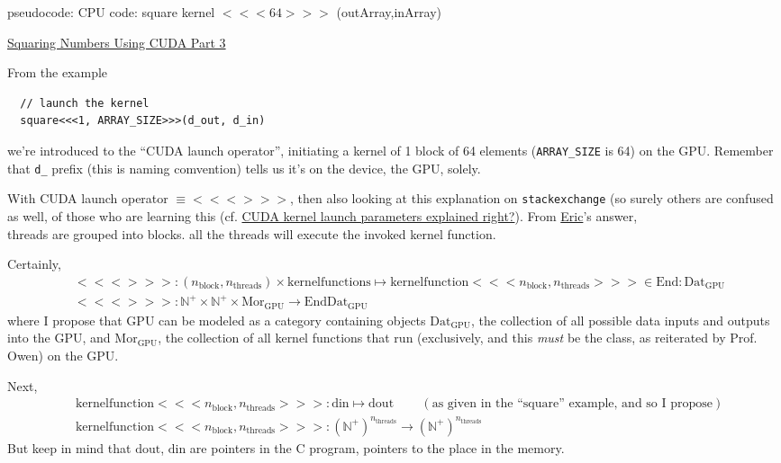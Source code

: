 \documentclass[10pt]{amsart}
\begin{document}
\begin{multicols*}{2}
pseudocode: CPU code: square kernel $<<< 64 >>>$ (outArray,inArray)

\href{https://classroom.udacity.com/courses/cs344/lessons/55120467/concepts/670742940923}{Squaring Numbers Using CUDA Part 3}

From the example
\begin{lstlisting}
  // launch the kernel
  square<<<1, ARRAY_SIZE>>>(d_out, d_in)
  \end{lstlisting}
we're introduced to the ``CUDA launch operator'', initiating a kernel of 1 block of 64 elements (\verb|ARRAY_SIZE| is 64) on the GPU.  Remember that \verb|d_| prefix (this is naming comvention) tells us it's on the device, the GPU, solely.  

With CUDA launch operator $\equiv <<<>>>$, then also looking at this explanation on \verb|stackexchange| (so surely others are confused as well, of those who are learning this (cf. \href{http://stackoverflow.com/questions/19240658/cuda-kernel-launch-parameters-explained-right}{CUDA kernel launch parameters explained right?}).  From \href{http://stackoverflow.com/users/1957265/eric}{Eric}'s answer, \\

threads are grouped into blocks.  all the threads will execute the invoked kernel function.

Certainly,
\[
\begin{aligned}
  & <<<>>>:(n_{\text{block}}, n_{\text{threads}})\times \text{kernelfunctions} \mapsto \text{kernelfunction}<<<n_{\text{block}},n_{\text{threads}}>>> \in \text{End}:\text{Dat}_{\text{GPU}} \\ 
  & <<<>>>: \mathbb{N}^+ \times \mathbb{N}^+ \times \text{Mor}_{\text{GPU}} \to \text{End}\text{Dat}_{\text{GPU}}
  \end{aligned}
\]
where I propose that GPU can be modeled as a category containing objects $\text{Dat}_{\text{GPU}}$, the collection of all possible data inputs and outputs into the GPU, and $\text{Mor}_{\text{GPU}}$, the collection of all kernel functions that run (exclusively, and this \emph{must} be the class, as reiterated by Prof. Owen) on the GPU.

Next,
\[
\begin{aligned}
  & \text{kernelfunction}<<<n_{\text{block}},n_{\text{threads}}>>>: \text{din}\mapsto \text{dout} \qquad \, (\text{as given in the ``square'' example, and so I propose}) \\ 
  & \text{kernelfunction}<<<n_{\text{block}},n_{\text{threads}}>>>:(\mathbb{N}^+)^{n_{\text{threads}}} \to (\mathbb{N}^+)^{n_{\text{threads}}}
  \end{aligned}
\]
But keep in mind that $\text{dout}$, $\text{din}$ are pointers in the C program, pointers to the place in the memory.  


\end{multicols*}
\end{document}
